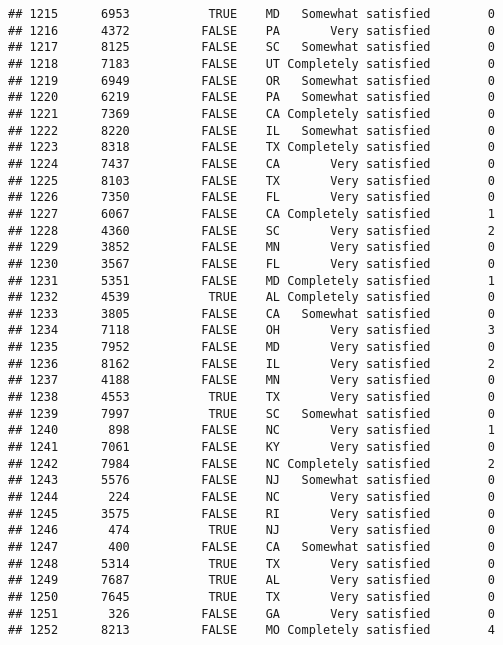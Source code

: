 \documentclass[]{book}
\theoremstyle{definition}
\theoremstyle{definition}
\theoremstyle{remark}
\begin{document}
\begin{verbatim}
## 1215      6953           TRUE    MD   Somewhat satisfied        0
## 1216      4372          FALSE    PA       Very satisfied        0
## 1217      8125          FALSE    SC   Somewhat satisfied        0
## 1218      7183          FALSE    UT Completely satisfied        0
## 1219      6949          FALSE    OR   Somewhat satisfied        0
## 1220      6219          FALSE    PA   Somewhat satisfied        0
## 1221      7369          FALSE    CA Completely satisfied        0
## 1222      8220          FALSE    IL   Somewhat satisfied        0
## 1223      8318          FALSE    TX Completely satisfied        0
## 1224      7437          FALSE    CA       Very satisfied        0
## 1225      8103          FALSE    TX       Very satisfied        0
## 1226      7350          FALSE    FL       Very satisfied        0
## 1227      6067          FALSE    CA Completely satisfied        1
## 1228      4360          FALSE    SC       Very satisfied        2
## 1229      3852          FALSE    MN       Very satisfied        0
## 1230      3567          FALSE    FL       Very satisfied        0
## 1231      5351          FALSE    MD Completely satisfied        1
## 1232      4539           TRUE    AL Completely satisfied        0
## 1233      3805          FALSE    CA   Somewhat satisfied        0
## 1234      7118          FALSE    OH       Very satisfied        3
## 1235      7952          FALSE    MD       Very satisfied        0
## 1236      8162          FALSE    IL       Very satisfied        2
## 1237      4188          FALSE    MN       Very satisfied        0
## 1238      4553           TRUE    TX       Very satisfied        0
## 1239      7997           TRUE    SC   Somewhat satisfied        0
## 1240       898          FALSE    NC       Very satisfied        1
## 1241      7061          FALSE    KY       Very satisfied        0
## 1242      7984          FALSE    NC Completely satisfied        2
## 1243      5576          FALSE    NJ   Somewhat satisfied        0
## 1244       224          FALSE    NC       Very satisfied        0
## 1245      3575          FALSE    RI       Very satisfied        0
## 1246       474           TRUE    NJ       Very satisfied        0
## 1247       400          FALSE    CA   Somewhat satisfied        0
## 1248      5314           TRUE    TX       Very satisfied        0
## 1249      7687           TRUE    AL       Very satisfied        0
## 1250      7645           TRUE    TX       Very satisfied        0
## 1251       326          FALSE    GA       Very satisfied        0
## 1252      8213          FALSE    MO Completely satisfied        4

\end{verbatim}
\end{document}
